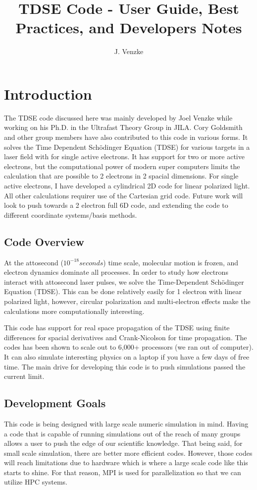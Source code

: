 \documentclass{article}
\title{TDSE Code - User Guide, Best Practices, and Developers Notes}
\author{J. Venzke}
\begin{document}
\maketitle
\section{Introduction} %
\label{sec:introduction}
The TDSE code discussed here was mainly developed by Joel Venzke while working on his Ph.D. in the Ultrafast Theory Group in JILA. Cory Goldsmith and other group members have also contributed to this code in various forms. It solves the Time Dependent Sch\"{o}dinger Equation (TDSE) for various targets in a laser field with for single active electrons. It has support for two or more active electrons, but the computational power of modern super computers limits the calculation that are possible to 2 electrons in 2 spacial dimensions. For single active electrons, I have developed a cylindrical 2D code for linear polarized light. All other calculations requirer use of the Cartesian grid code. Future work will look to push towards a 2 electron full 6D code, and extending the code to different coordinate systems/basis methods.

\subsection{Code Overview} %
\label{sub:code_overview}
At the attosecond ($10^{-18} seconds$) time scale, molecular motion is frozen, and electron dynamics dominate all processes. In order to study how electrons interact with attosecond laser pulses, we solve the Time-Dependent Sch\"{o}dinger Equation (TDSE). This can be done relatively easily for 1 electron with linear polarized light, however, circular polarization and multi-electron effects make the calculations more computationally interesting.

This code has support for real space propagation of the TDSE using finite differences for spacial derivatives and Crank-Nicolson for time propagation. The codes has been shown to scale out to 6,000+ processors (we ran out of computer). It can also simulate interesting physics on a laptop if you have a few days of free time. The main drive for developing this code is to push simulations passed the current limit.

\subsection{Development Goals} %
\label{sub:development_goals}
This code is being designed with large scale numeric simulation in mind. Having a code that is capable of running simulations out of the reach of many groups allows a user to push the edge of our scientific knowledge. That being said, for small scale simulation, there are better more efficient codes. However, those codes will reach limitations due to hardware which is where a large scale code like this starts to shine. For that reason, MPI is used for parallelization so that we can utilize HPC systems.
\end{document}
